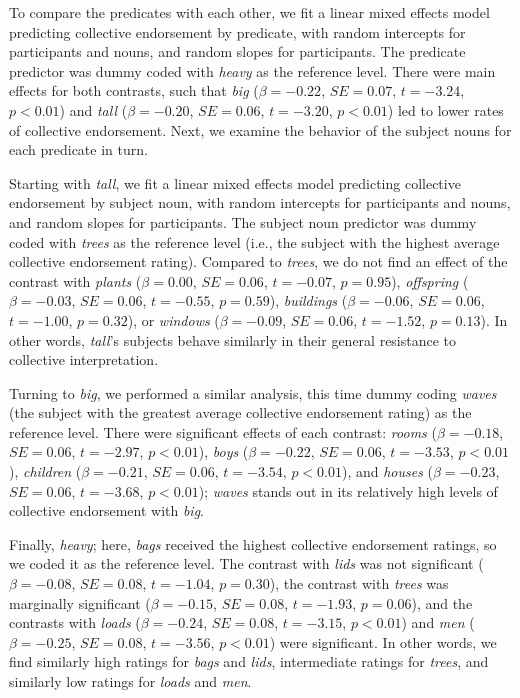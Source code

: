 \documentclass[linguex]{sp}
\begin{document}
To compare the predicates with each other, we fit a linear mixed effects model predicting collective endorsement by predicate, with random intercepts for participants and nouns, and random slopes for participants. The predicate predictor was dummy coded with \emph{heavy} as the reference level. There were main effects for both contrasts, such that \emph{big} ($\beta=-0.22$, $SE=0.07$, $t=-3.24$, $p<0.01$) and \emph{tall} ($\beta=-0.20$, $SE=0.06$, $t=-3.20$, $p<0.01$) led to lower rates of collective endorsement. Next, we examine the behavior of the subject nouns for each predicate in turn.

Starting with \emph{tall}, we fit a linear mixed effects model predicting collective endorsement by subject noun, with random intercepts for participants and nouns, and random slopes for participants. The subject noun predictor was dummy coded with \emph{trees} as the reference level (i.e., the subject with the highest average collective endorsement rating). Compared to \emph{trees}, we do not find an effect of the contrast with \emph{plants} ($\beta=0.00$, $SE=0.06$, $t=-0.07$, $p=0.95$), \emph{offspring} ($\beta=-0.03$, $SE=0.06$, $t=-0.55$, $p=0.59$), \emph{buildings} ($\beta=-0.06$, $SE=0.06$, $t=-1.00$, $p=0.32$), or \emph{windows} ($\beta=-0.09$, $SE=0.06$, $t=-1.52$, $p=0.13$). In other words, \emph{tall}'s subjects behave similarly in their general resistance to collective interpretation. 

Turning to \emph{big}, we performed a similar analysis, this time dummy coding \emph{waves} (the subject with the greatest average collective endorsement rating) as the reference level. There were significant effects of each contrast: \emph{rooms} ($\beta=-0.18$, $SE=0.06$, $t=-2.97$, $p<0.01$), \emph{boys} ($\beta=-0.22$, $SE=0.06$, $t=-3.53$, $p<0.01$), \emph{children} ($\beta=-0.21$, $SE=0.06$, $t=-3.54$, $p<0.01$), and \emph{houses} ($\beta=-0.23$, $SE=0.06$, $t=-3.68$, $p<0.01$); \emph{waves} stands out in its relatively high levels of collective endorsement with \emph{big}.

Finally, \emph{heavy}; here, \emph{bags} received the highest collective endorsement ratings, so we coded it as the reference level. The contrast with \emph{lids} was not significant ($\beta=-0.08$, $SE=0.08$, $t=-1.04$, $p=0.30$), the contrast with \emph{trees} was marginally significant ($\beta=-0.15$, $SE=0.08$, $t=-1.93$, $p=0.06$), and the contrasts with \emph{loads} ($\beta=-0.24$, $SE=0.08$, $t=-3.15$, $p<0.01$) and \emph{men} ($\beta=-0.25$, $SE=0.08$, $t=-3.56$, $p<0.01$) were significant. In other words, we find similarly high ratings for \emph{bags} and \emph{lids}, intermediate ratings for \emph{trees}, and similarly low ratings for \emph{loads} and \emph{men}.
\end{document}
